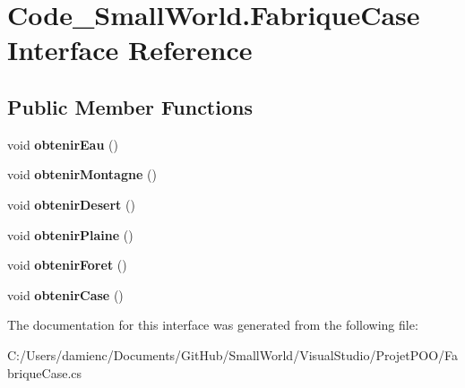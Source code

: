 \hypertarget{interface_code___small_world_1_1_fabrique_case}{\section{Code\-\_\-\-Small\-World.\-Fabrique\-Case Interface Reference}
\label{interface_code___small_world_1_1_fabrique_case}
}
\subsection*{Public Member Functions}
\begin{DoxyCompactItemize}
\item 
\hypertarget{interface_code___small_world_1_1_fabrique_case_ac65a293584f1cfd8651a58e187bdf5dd}{void {\bfseries obtenir\-Eau} ()}\label{interface_code___small_world_1_1_fabrique_case_ac65a293584f1cfd8651a58e187bdf5dd}

\item 
\hypertarget{interface_code___small_world_1_1_fabrique_case_abeece57e75e942ca601573afae892c72}{void {\bfseries obtenir\-Montagne} ()}\label{interface_code___small_world_1_1_fabrique_case_abeece57e75e942ca601573afae892c72}

\item 
\hypertarget{interface_code___small_world_1_1_fabrique_case_a0d940148059a5822c144060adc1cb35f}{void {\bfseries obtenir\-Desert} ()}\label{interface_code___small_world_1_1_fabrique_case_a0d940148059a5822c144060adc1cb35f}

\item 
\hypertarget{interface_code___small_world_1_1_fabrique_case_a834cb247f9b2cb44b5d7093f87fe02ca}{void {\bfseries obtenir\-Plaine} ()}\label{interface_code___small_world_1_1_fabrique_case_a834cb247f9b2cb44b5d7093f87fe02ca}

\item 
\hypertarget{interface_code___small_world_1_1_fabrique_case_a3f203d3e3c3e07f2b88de30858303db4}{void {\bfseries obtenir\-Foret} ()}\label{interface_code___small_world_1_1_fabrique_case_a3f203d3e3c3e07f2b88de30858303db4}

\item 
\hypertarget{interface_code___small_world_1_1_fabrique_case_a8ab2d827e269eabfd659d98a003f2a05}{void {\bfseries obtenir\-Case} ()}\label{interface_code___small_world_1_1_fabrique_case_a8ab2d827e269eabfd659d98a003f2a05}

\end{DoxyCompactItemize}


The documentation for this interface was generated from the following file\-:\begin{DoxyCompactItemize}
\item 
C\-:/\-Users/damienc/\-Documents/\-Git\-Hub/\-Small\-World/\-Visual\-Studio/\-Projet\-P\-O\-O/Fabrique\-Case.\-cs\end{DoxyCompactItemize}
